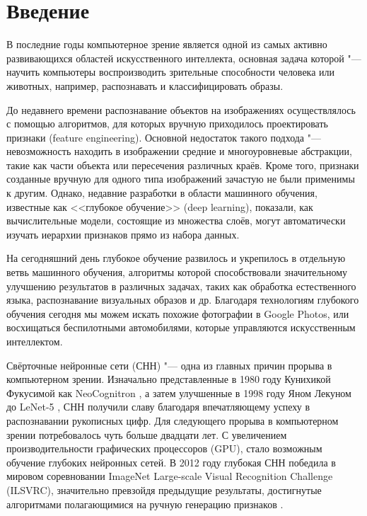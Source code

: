\section{Введение}
В последние годы компьютерное зрение является одной из самых активно развивающихся областей 
искусственного интеллекта, основная задача которой "--- научить компьютеры воспроизводить 
зрительные способности человека или животных, например, распознавать и классифицировать образы.

До недавнего времени распознавание объектов на изображениях осуществлялось с помощью 
алгоритмов, для которых вручную приходилось проектировать признаки (feature engineering). 
Основной недостаток такого подхода "--- невозможность находить в изображении 
средние и многоуровневые абстракции, такие как части объекта или пересечения различных краёв. 
Кроме того, признаки созданные вручную для одного типа изображений зачастую не были применимы к 
другим. Однако, недавние разработки в области машинного обучения, известные как <<глубокое 
обучение>> (deep learning), показали, как вычислительные модели, состоящие из множества слоёв, 
могут автоматически изучать иерархии признаков прямо из набора данных.

На сегодняшний день глубокое обучение развилось и укрепилось в отдельную ветвь машинного обучения, 
алгоритмы которой способствовали значительному улучшению результатов в различных задачах, таких как 
обработка естественного языка, распознавание визуальных образов и др. Благодаря технологиям 
глубокого обучения сегодня мы можем искать похожие фотографии в Google Photos, или восхищаться 
беспилотными автомобилями, которые управляются искусственным интеллектом.

Свёрточные нейронные сети (СНН) "--- одна из главных причин прорыва в компьютерном зрении. 
Изначально представленные в 1980 году Кунихикой Фукусимой как NeoCognitron \cite{Neocognitron}, а 
затем улучшенные в 1998 году Яном Лекуном до LeNet-5 \cite{lecun-98}, СНН получили славу благодаря 
впечатляющему успеху в  распознавании рукописных цифр. Для следующего прорыва в компьютерном зрении 
потребовалось чуть больше двадцати лет. С увеличением производительности графических процессоров 
(GPU), стало возможным обучение глубоких нейронных сетей. В 2012 году глубокая СНН победила в 
мировом соревновании ImageNet Large-scale Visual Recognition Challenge (ILSVRC), значительно 
превзойдя предыдущие результаты, достигнутые алгоритмами полагающимися на ручную генерацию 
признаков \cite{NIPS2012_4824}.

